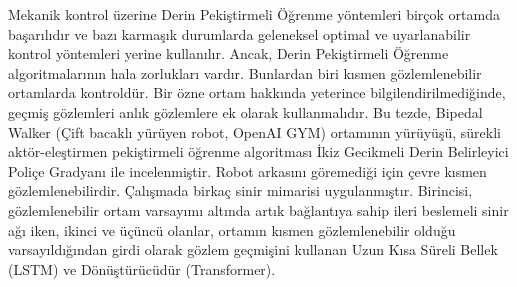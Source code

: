 Mekanik kontrol üzerine Derin Pekiştirmeli Öğrenme yöntemleri birçok ortamda başarılıdır ve bazı karmaşık durumlarda geleneksel optimal ve uyarlanabilir kontrol yöntemleri yerine kullanılır. Ancak, Derin Pekiştirmeli Öğrenme algoritmalarının hala zorlukları vardır. Bunlardan biri kısmen gözlemlenebilir ortamlarda kontroldür. Bir özne ortam hakkında yeterince bilgilendirilmediğinde, geçmiş gözlemleri anlık gözlemlere ek olarak kullanmalıdır. Bu tezde, Bipedal Walker (Çift bacaklı yürüyen robot, OpenAI GYM) ortamının yürüyüşü, sürekli aktör-eleştirmen pekiştirmeli öğrenme algoritması İkiz Gecikmeli Derin Belirleyici Poliçe Gradyanı ile incelenmiştir. Robot arkasını göremediği için çevre kısmen gözlemlenebilirdir. Çalışmada birkaç sinir mimarisi uygulanmıştır. Birincisi, gözlemlenebilir ortam varsayımı altında artık bağlantıya sahip ileri beslemeli sinir ağı iken, ikinci ve üçüncü olanlar, ortamın kısmen gözlemlenebilir olduğu varsayıldığından girdi olarak gözlem geçmişini kullanan Uzun Kısa Süreli Bellek (LSTM) ve Dönüştürücüdür (Transformer).